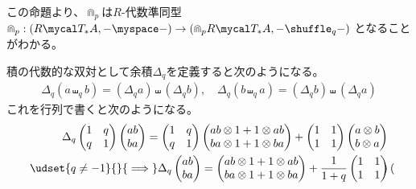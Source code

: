 {	この命題より、$\Cap_p$は$R$-代数準同型
	$\Cap_p:(R\T_*A,-\myspace-)\to(\Cap_pR\T_*A,-\shuffle_q-)$
	となることがわかる。

	\begin{todo}[余積の性質]\label{todo:余積の性質} %
		積の代数的な双対として余積$\Delta_q$を定義すると次のようになる。
		\begin{equation*}\begin{split}
			\Delta_q(a\shuffle_qb) = (\Delta_qa)\shuffle(\Delta_qb),\quad
			\Delta_q(b\shuffle_qa) = (\Delta_qb)\shuffle(\Delta_qa)
		\end{split}\end{equation*}
		これを行列で書くと次のようになる。
		\begin{equation*}\begin{split}
			\Delta_q \begin{pmatrix}
				1 & q \\ q & 1
			\end{pmatrix} \begin{pmatrix}
				ab \\ ba
			\end{pmatrix} = \begin{pmatrix}
				1 & q \\ q & 1
			\end{pmatrix} \begin{pmatrix}
				ab\otimes 1 + 1\otimes ab \\ ba\otimes 1 + 1\otimes ba
			\end{pmatrix} + \begin{pmatrix}
				1 & 1 \\ 1 & 1
			\end{pmatrix} \begin{pmatrix}
				a\otimes b \\ b\otimes a
			\end{pmatrix} \\
			\udset{q\neq-1}{}{\implies} \Delta_q \begin{pmatrix}
				ab \\ ba
			\end{pmatrix} = \begin{pmatrix}
				ab\otimes 1 + 1\otimes ab \\ ba\otimes 1 + 1\otimes ba
			\end{pmatrix} + \frac{1}{1+q}\begin{pmatrix}
				1 & 1 \\ 1 & 1
			\end{pmatrix}\begin{pmatrix}

\end{pmatrix}
\end{split}
\end{equation*}
\end{todo}}
